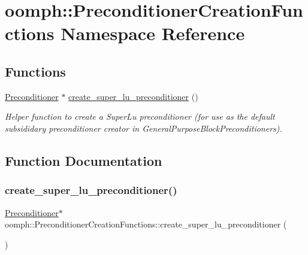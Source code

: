 \hypertarget{namespaceoomph_1_1PreconditionerCreationFunctions}{}\section{oomph\+:\+:Preconditioner\+Creation\+Functions Namespace Reference}
\label{namespaceoomph_1_1PreconditionerCreationFunctions}
\subsection*{Functions}
\begin{DoxyCompactItemize}
\item 
\hyperlink{classoomph_1_1Preconditioner}{Preconditioner} $\ast$ \hyperlink{namespaceoomph_1_1PreconditionerCreationFunctions_a99628579d47aa9048467b02c5acd96a5}{create\+\_\+super\+\_\+lu\+\_\+preconditioner} ()
\begin{DoxyCompactList}\small\item\em Helper function to create a Super\+Lu preconditioner (for use as the default subsididary preconditioner creator in General\+Purpose\+Block\+Preconditioners). \end{DoxyCompactList}\end{DoxyCompactItemize}


\subsection{Function Documentation}
\mbox{\label{namespaceoomph_1_1PreconditionerCreationFunctions_a99628579d47aa9048467b02c5acd96a5}} 
\subsubsection{\texorpdfstring{create\+\_\+super\+\_\+lu\+\_\+preconditioner()}{create\_super\_lu\_preconditioner()}}
{\footnotesize\ttfamily \hyperlink{classoomph_1_1Preconditioner}{Preconditioner}$\ast$ oomph\+::\+Preconditioner\+Creation\+Functions\+::create\+\_\+super\+\_\+lu\+\_\+preconditioner (\begin{DoxyParamCaption}{ }\end{DoxyParamCaption})\hspace{0.3cm}{\ttfamily [inline]}}



